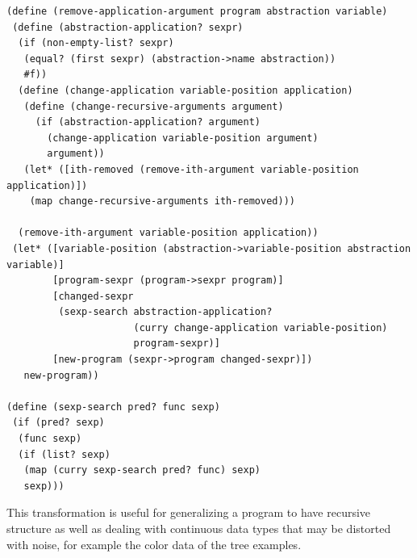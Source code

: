 \documentclass[a4paper,10pt]{article}
\begin{document}
\begin{lstlisting}[frame=trBL]
(define (remove-application-argument program abstraction variable)
 (define (abstraction-application? sexpr)
  (if (non-empty-list? sexpr)
   (equal? (first sexpr) (abstraction->name abstraction))
   #f))
  (define (change-application variable-position application)
   (define (change-recursive-arguments argument) 
     (if (abstraction-application? argument)
       (change-application variable-position argument)
       argument))
   (let* ([ith-removed (remove-ith-argument variable-position application)])
    (map change-recursive-arguments ith-removed)))
 
  (remove-ith-argument variable-position application))
 (let* ([variable-position (abstraction->variable-position abstraction variable)]
        [program-sexpr (program->sexpr program)]
        [changed-sexpr 
         (sexp-search abstraction-application? 
                      (curry change-application variable-position) 
                      program-sexpr)]
        [new-program (sexpr->program changed-sexpr)])
   new-program))
  
(define (sexp-search pred? func sexp)
 (if (pred? sexp)
  (func sexp)
  (if (list? sexp)
   (map (curry sexp-search pred? func) sexp)
   sexp)))
\end{lstlisting}
This transformation is useful for generalizing a program to have recursive structure as well as dealing with continuous data types that may be distorted with noise, for example the color data of the tree examples.
\end{document}
